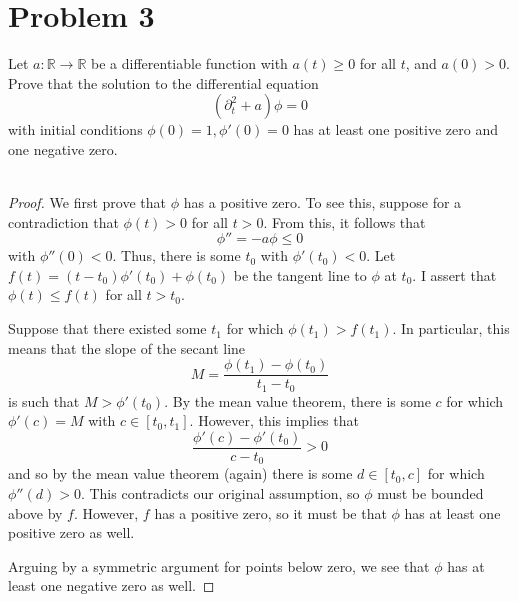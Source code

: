 \documentclass[fontsize=11pt]{scrartcl} %
\numberwithin{equation}{section} %
\numberwithin{figure}{section} %
\numberwithin{table}{section} %
\newcommand{\R}{\mathbb{R}}
\begin{document}
\newpage

\section*{Problem 3}
Let $a:\R\to\R$ be a differentiable function with $a(t)\geq 0$ for all $t$, and
$a(0)>0$. Prove that the solution to the differential equation
\[
    (\partial_t^2 + a)\phi = 0
\]
with initial conditions $\phi(0)=1,\phi'(0)=0$ has at least one positive zero
and one negative zero.
\\
\\
\begin{proof}
    We first prove that $\phi$ has a positive zero. To see this, suppose for a
    contradiction that $\phi(t)>0$ for all $t>0$. From this, it follows that
    \[
        \phi'' = -a\phi \leq 0
    \]
    with $\phi''(0)<0$. Thus, there is some $t_0$ with $\phi'(t_0)<0$. Let
    $f(t) = (t-t_0)\phi'(t_0) + \phi(t_0)$ be the tangent line to $\phi$ at
    $t_0$. I assert that $\phi(t)\leq f(t)$ for all $t>t_0$.

    Suppose that there existed some $t_1$ for which $\phi(t_1)>f(t_1)$. In
    particular, this means that the slope of the secant line
    \[
        M = \frac{\phi(t_1)-\phi(t_0)}{t_1-t_0}
    \]
    is such that $M>\phi'(t_0)$. By the mean value theorem, there is some $c$
    for which $\phi'(c)=M$ with $c\in[t_0,t_1]$. However, this implies that
    \[
        \frac{\phi'(c)-\phi'(t_0)}{c-t_0}>0
    \]
    and so by the mean value theorem (again) there is some $d\in[t_0,c]$ for
    which $\phi''(d)>0$. This contradicts our original assumption, so $\phi$
    must be bounded above by $f$. However, $f$ has a positive zero, so it must
    be that $\phi$ has at least one positive zero as well.

    Arguing by a symmetric argument for points below zero, we see that $\phi$
    has at least one negative zero as well.
\end{proof}

\newpage
\end{document}
